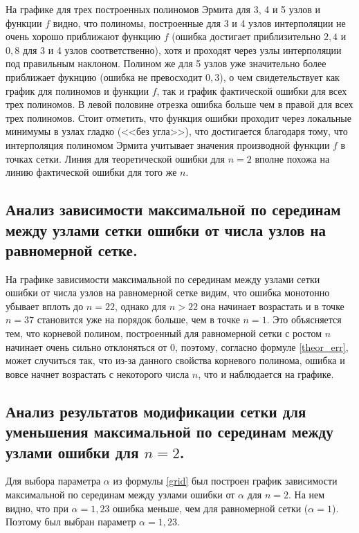 \documentclass[a4paper, 12pt]{article}
\begin{document}
	На графике для трех построенных полиномов Эрмита для 3, 4 и 5 узлов и функции $f$ видно, что полиномы, построенные для 3 и 4 узлов интерполяции не очень хорошо приближают функцию $f$ (ошибка достигает приблизительно $2,4$ и $0,8$ для 3 и 4 узлов соответственно), хотя и проходят через узлы интерполяции под правильным наклоном. Полином же для 5 узлов уже значительно более приближает фукнцию (ошибка не превосходит $0,3$), о чем свидетельствует как график для полиномов и функции $f$, так и график фактической ошибки для всех трех полиномов. В левой половине отрезка ошибка больше чем в правой для всех трех полиномов. Стоит отметить, что функция ошибки проходит через локальные минимумы в узлах гладко (<<без угла>>), что достигается благодаря тому, что интерполяция полиномом Эрмита учитывает значения производной функции $f$ в точках сетки. Линия для теоретической ошибки для $n=2$ вполне похожа на линию фактической ошибки для того же $n$.
	
	\subsection{Анализ зависимости максимальной по серединам между узлами сетки ошибки от числа узлов на равномерной сетке.}
	
	На графике зависимости максимальной по серединам между узлами сетки ошибки от числа узлов на равномерной сетке видим, что ошибка монотонно убывает вплоть до $n=22$, однако для $n>22$ она начинает возрастать и в точке $n=37$ становится уже на порядок больше, чем в точке $n=1$. Это объясняется тем, что корневой полином, построенный для равномерной сетки с ростом $n$ начинает очень сильно отклоняться от 0, поэтому, согласно формуле \eqref{theor_err}, может случиться так, что из-за данного свойства корневого полинома, ошибка и вовсе начнет возрастать с некоторого числа $n$, что и наблюдается на графике.
	
	\subsection{Анализ результатов модификации сетки для уменьшения максимальной по серединам между узлами ошибки для $n=2$.}
	
	Для выбора параметра $\alpha$ из формулы \eqref{grid} был построен график зависимости максимальной по серединам между узлами ошибки от $\alpha$ для $n=2$. На нем видно, что при $\alpha=1,23$ ошибка меньше, чем для равномерной сетки ($\alpha=1$). Поэтому был выбран параметр $\alpha=1,23$.
	
\end{document}
